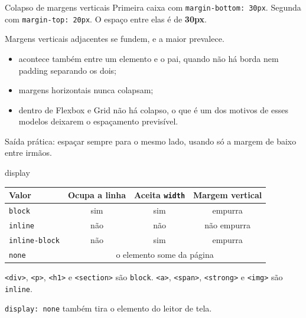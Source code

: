 \documentclass{beamer}
\begin{document}
\begin{frame}{Colapso de margens verticais}
	Primeira caixa com \texttt{margin-bottom: 30px}. Segunda com
	\texttt{margin-top: 20px}. O espaço entre elas é de \textbf{30px}.

	\vspace{0.4cm}
	Margens verticais adjacentes se fundem, e a maior prevalece.

	\begin{itemize}
		\item acontece também entre um elemento e o pai, quando não há borda nem
		      padding separando os dois;
		\item margens horizontais nunca colapsam;
		\item dentro de Flexbox e Grid não há colapso, o que é um dos motivos de
		      esses modelos deixarem o espaçamento previsível.
	\end{itemize}

	\vspace{0.3cm}
	Saída prática: espaçar sempre para o mesmo lado, usando só a margem de baixo
	entre irmãos.
\end{frame}

\begin{frame}{display}
	\begin{center}
		\small
		\begin{tabular}{lccc}
			\toprule
			\textbf{Valor}        & \textbf{Ocupa a linha}                        & \textbf{Aceita \texttt{width}} &
			\textbf{Margem vertical}                                                                                             \\
			\midrule
			\texttt{block}        & sim                                           & sim                            & empurra     \\
			\texttt{inline}       & não                                           & não                            & não empurra \\
			\texttt{inline-block} & não                                           & sim                            & empurra     \\
			\texttt{none}         & \multicolumn{3}{c}{o elemento some da página}                                                \\
			\bottomrule
		\end{tabular}
	\end{center}

	\vspace{0.4cm}
	\texttt{<div>}, \texttt{<p>}, \texttt{<h1>} e \texttt{<section>} são
	\texttt{block}. \texttt{<a>}, \texttt{<span>}, \texttt{<strong>} e
	\texttt{<img>} são \texttt{inline}.

	\vspace{0.2cm}
	\texttt{display: none} também tira o elemento do leitor de tela.
\end{frame}
\end{document}
